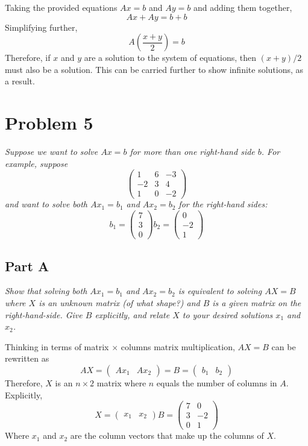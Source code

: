 \documentclass{article}
\begin{document}
\bigbreak

Taking the provided equations $ Ax = b $ and $ Ay = b $ and adding them
together,
$$ Ax + Ay = b + b $$
Simplifying further,
$$ A \left( \frac{x + y}{2} \right) = b $$
Therefore, if $ x $ and $ y $ are a solution to the system of equations, then $
(x + y) / 2 $ must also be a solution. This can be carried further to show
infinite solutions, as a result.

\section*{Problem 5}

\textit{Suppose we want to solve $ Ax = b $ for more than one right-hand side $
b $. For example, suppose}
\[
    \begin{pmatrix}
        1 & 6 & -3 \\
        -2 & 3 & 4 \\
        1 & 0 & -2
    \end{pmatrix}
\]
\textit{and want to solve both $ Ax_1 = b_1 $ and $ Ax_2 = b_2 $ for the
right-hand sides:}
\[
    b_1 = \begin{pmatrix}
        7 \\
        3 \\
        0
    \end{pmatrix}
    b_2 = \begin{pmatrix}
        0 \\
        -2 \\
        1
    \end{pmatrix}
\]

\subsection*{Part A}

\textit{Show that solving both  $ Ax_1 = b_1 $  and $ Ax_2=b_2 $ is equivalent
to solving $ AX = B $ where $ X $ is an unknown matrix (of what shape?) and $ B
$ is a given matrix on the right-hand-side. Give $ B $ explicitly, and relate $
X $ to your desired solutions $ x_1 $ and $ x_2 $.}

\bigbreak

Thinking in terms of matrix $ \times $ columns matrix multiplication, $ AX = B $
can be rewritten as
\[
    AX = \begin{pmatrix}
        A x_1 & A x_2
    \end{pmatrix}
    = B = \begin{pmatrix}
        b_1 & b_2
    \end{pmatrix}
\]
Therefore, $ X $ is an $ n \times 2 $ matrix where $ n $ equals the number of
columns in $ A $. Explicitly,
\[
    X = \begin{pmatrix}
        x_1 & x_2
    \end{pmatrix}
    B = \begin{pmatrix}
        7 & 0 \\
        3 & -2 \\
        0 & 1
    \end{pmatrix}
\]
Where $ x_1 $ and $ x_2 $ are the column vectors that make up the columns of $ X
$.
\end{document}

